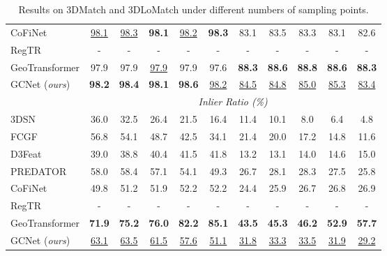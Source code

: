 \documentclass[10pt,twocolumn,letterpaper]{article}
\begin{document}
\begin{table}[b!]
\begin{tabular}{lccccc|ccccc}
CoFiNet\cite{yu2021cofinet} & \underline{98.1} & \underline{98.3} & \textbf{98.1} & \underline{98.2} & \textbf{98.3} & 83.1 & 83.5 & 83.3 & 83.1 & 82.6 \\
RegTR\cite{yew2022regtr} & - & - & - & - & - & - & - & - & - & - \\
GeoTransformer\cite{qin2022geometric} & 97.9 & 97.9 & \underline{97.9} & 97.9 & 97.6 & \textbf{88.3} & \textbf{88.6} & \textbf{88.8} & \textbf{88.6} & \textbf{88.3}\\
GCNet ({\em ours}) & \textbf{98.2} & \textbf{98.4} & \textbf{98.1} & \textbf{98.6} & \underline{98.2} & \underline{84.5} & \underline{84.8} & \underline{85.0} & \underline{85.3} & \underline{83.4} \\
\midrule
& \multicolumn{10}{c}{{\it Inlier Ratio (\%)} } \\
\midrule
3DSN\cite{gojcic2019perfect} & 36.0 & 32.5 & 26.4 & 21.5 & 16.4 & 11.4 & 10.1 & 8.0 & 6.4 & 4.8 \\
FCGF\cite{choy2019fully} & 56.8 & 54.1 & 48.7 & 42.5 & 34.1 & 21.4 & 20.0 & 17.2 & 14.8 & 11.6 \\
D3Feat\cite{bai2020d3feat} & 39.0 & 38.8 & 40.4 & 41.5 & 41.8 & 13.2 & 13.1 & 14.0 & 14.6 & 15.0 \\
PREDATOR\cite{huang2021predator} & 58.0 & 58.4 & 57.1 & 54.1 & 49.3 & 26.7 & 28.1 & 28.3 & 27.5 & 25.8 \\
CoFiNet\cite{yu2021cofinet} & 49.8 & 51.2 & 51.9 & 52.2 & 52.2 & 24.4 & 25.9 & 26.7 & 26.8 & 26.9  \\
RegTR\cite{yew2022regtr} & - & - & - & - & - & - & - & - & - & - \\
GeoTransformer\cite{qin2022geometric} & \textbf{71.9} & \textbf{75.2} & \textbf{76.0} & \textbf{82.2} & \textbf{85.1} & \textbf{43.5} & \textbf{45.3} & \textbf{46.2} & \textbf{52.9} & \textbf{57.7} \\
GCNet ({\em ours}) & \underline{63.1} & \underline{63.5} & \underline{61.5} & \underline{57.6} & \underline{51.1} & \underline{31.8} & \underline{33.3} & \underline{33.5} & \underline{31.9} & \underline{29.2} \\
\bottomrule
\end{tabular}
\vspace{-1.25em}
\caption{Results on 3DMatch and 3DLoMatch under different numbers of sampling points.}
\vspace{-.5em}
\label{tab:3dmatch_3dlomatch}
\end{table}

\vspace{-1.75em}
\end{document}
